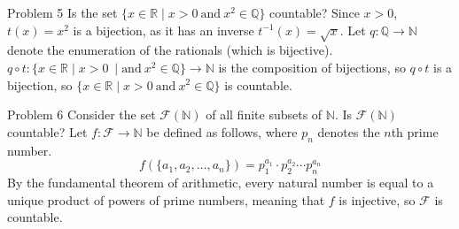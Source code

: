 \documentclass[10pt]{extarticle}
\begin{document}
  \begin{problem}{Problem 5}
    Is the set $\{x\in\mathbb{R} \mid x>0~\textrm{and}~x^2\in\mathbb{Q}\}$ countable?
    \tcblower
    Since $x>0$, $t(x) = x^2$ is a bijection, as it has an inverse $t^{-1}(x) = \sqrt{x}$. Let $q: \mathbb{Q} \rightarrow \mathbb{N}$ denote the enumeration of the rationals (which is bijective).\\

    $q\circ t: \{x\in\mathbb{R} \mid x>0~\mid\text{and}~x^2\in\mathbb{Q}\} \rightarrow \mathbb{N}$ is the composition of bijections, so $q\circ t$ is a bijection, so $\{x\in\mathbb{R}\mid x>0~\text{and}~x^2\in\mathbb{Q}\}$ is countable.
  \end{problem}
  \begin{problem}{Problem 6}
    Consider the set $\mathcal{F}(\mathbb{N})$ of all finite subsets of $\mathbb{N}$. Is $\mathcal{F}(\mathbb{N})$ countable?
    \tcblower
    Let $f: \mathcal{F} \rightarrow \mathbb{N}$ be defined as follows, where $p_n$ denotes the $n$th prime number.
    \[
      f(\{a_1,a_2,\dots,a_n\}) = p_1^{a_1}\cdot p_2^{a_2}\cdots p_{n}^{a_n}
    \] 
    By the fundamental theorem of arithmetic, every natural number is equal to a unique product of powers of prime numbers, meaning that $f$ is injective, so $\mathcal{F}$ is countable.
  \end{problem}
\end{document}
